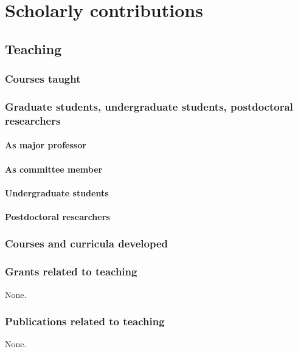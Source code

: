 \section{Scholarly contributions}

\subsection{Teaching}

\subsubsection{Courses taught}


\subsubsection{Graduate students, undergraduate students, postdoctoral researchers}

\paragraph{As major professor}


\paragraph{As committee member}


\paragraph{Undergraduate students}


\paragraph{Postdoctoral researchers}


\subsubsection{Courses and curricula developed}


\subsubsection{Grants related to teaching}
None.

\subsubsection{Publications related to teaching}
None.

